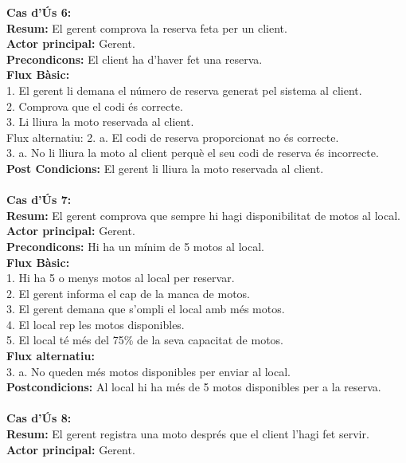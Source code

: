 \documentclass{article}
\begin{document}
\textbf{Cas d'\'Us 6:}\\
\textbf{Resum:} El gerent comprova la reserva feta per un client.\\
\textbf{Actor principal:} Gerent.\\
\textbf{Precondicons:} El client ha d'haver fet una reserva.\\
\textbf{Flux B\`asic:}\\
1. El gerent li demana el n\'umero de reserva generat pel sistema al client.\\
2. Comprova que el codi \'es correcte.\\
3. Li lliura la moto reservada al client.\\
Flux alternatiu: 
2. a. El codi de reserva proporci\textbf{}onat no \'es correcte.\\
3. a. No li lliura la moto al client perquè el seu codi de reserva \'es incorrecte.\\
\textbf{Post Condicions:} El gerent li lliura la moto reservada al client.\\\\
\textbf{Cas d'\'Us 7:}\\
\textbf{Resum:} El gerent comprova que sempre hi hagi disponibilitat de motos al local.\\
\textbf{Actor principal:} Gerent.\\
\textbf{Precondicons:} Hi ha un m\'inim de 5 motos al local.\\
\textbf{Flux B\`asic:}\\
1. Hi ha 5 o menys motos al local per reservar.\\
2. El gerent informa el cap de la manca de motos.\\
3. El gerent demana que s'ompli el local amb m\'es motos.\\
4. El local rep les motos disponibles.\\
5. El local t\'e m\'es del 75\% de la seva capacitat de motos.\\
\textbf{Flux alternatiu:\\}
3. a. No queden m\'es motos disponibles per enviar al local.\\
\textbf{Postcondicions:} Al local hi ha m\'es de 5 motos disponibles per a la reserva.\\\\
\textbf{Cas d'\'Us 8:}\\
\textbf{Resum:} El gerent registra una moto despr\'es que el client l'hagi fet servir.\\
\textbf{Actor principal:} Gerent.\\
\end{document}
